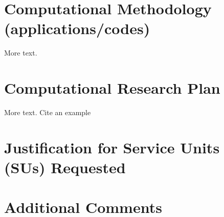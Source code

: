 \documentclass{proposalnsf}
\begin{document}
\section*{Computational Methodology (applications/codes)}

More text.

\section*{Computational Research Plan}

More text.  Cite an example \cite[]{sample_ref}

\section*{Justification for Service Units (SUs) Requested}

\section*{Additional Comments}





\newpage
{}
\renewcommand{\thepage} {E--\arabic{page}}




\newpage
{}
\renewcommand{\thepage} {G--\arabic{page}}
\end{document}
